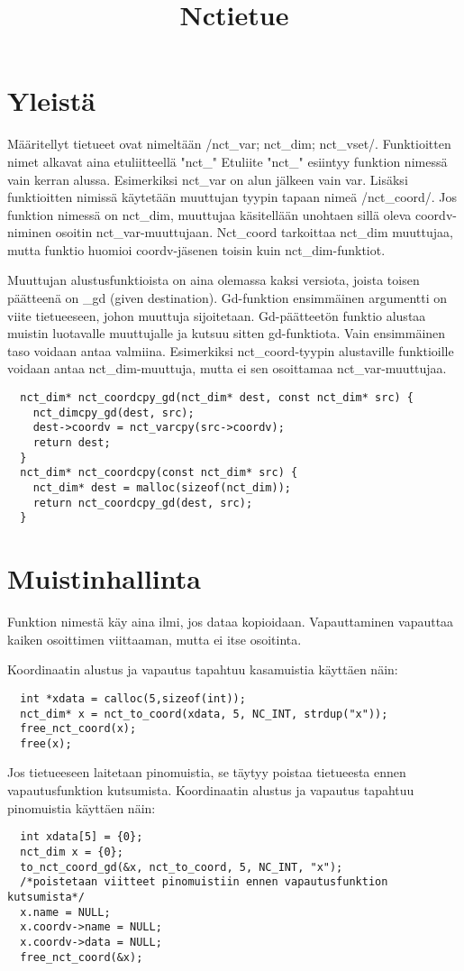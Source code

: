 \documentclass{scrartcl}
\title{Nctietue}
\begin{document}
\maketitle

\section{Yleistä}
Määritellyt tietueet ovat nimeltään \cinline/nct_var; nct_dim; nct_vset/.
Funktioitten nimet alkavat aina etuliitteellä "nct\_"
Etuliite "nct\_" esiintyy funktion nimessä vain kerran alussa.
Esimerkiksi nct\_var on alun jälkeen vain var.
Lisäksi funktioitten nimissä käytetään muuttujan tyypin tapaan nimeä \cinline/nct_coord/.
Jos funktion nimessä on nct\_dim, muuttujaa käsitellään unohtaen sillä oleva coordv-niminen osoitin nct\_var-muuttujaan.
Nct\_coord tarkoittaa nct\_dim muuttujaa, mutta funktio huomioi coordv-jäsenen toisin kuin nct\_dim-funktiot.

Muuttujan alustusfunktioista on aina olemassa kaksi versiota, joista toisen päätteenä on \_gd (given destination).
Gd-funktion ensimmäinen argumentti on viite tietueeseen, johon muuttuja sijoitetaan.
Gd-päätteetön funktio alustaa muistin luotavalle muuttujalle ja kutsuu sitten gd-funktiota.
Vain ensimmäinen taso voidaan antaa valmiina.
Esimerkiksi nct\_coord-tyypin alustaville funktioille voidaan antaa nct\_dim-muuttuja, mutta ei sen osoittamaa nct\_var-muuttujaa.
\begin{verbatim}
  nct_dim* nct_coordcpy_gd(nct_dim* dest, const nct_dim* src) {
    nct_dimcpy_gd(dest, src);
    dest->coordv = nct_varcpy(src->coordv);
    return dest;
  }
  nct_dim* nct_coordcpy(const nct_dim* src) {
    nct_dim* dest = malloc(sizeof(nct_dim));
    return nct_coordcpy_gd(dest, src);
  }
\end{verbatim}

\section{Muistinhallinta}
Funktion nimestä käy aina ilmi, jos dataa kopioidaan.
Vapauttaminen vapauttaa kaiken osoittimen viittaaman, mutta ei itse osoitinta.

Koordinaatin alustus ja vapautus tapahtuu kasamuistia käyttäen näin:
\begin{verbatim}
  int *xdata = calloc(5,sizeof(int));
  nct_dim* x = nct_to_coord(xdata, 5, NC_INT, strdup("x"));
  free_nct_coord(x);
  free(x);
\end{verbatim}
Jos tietueeseen laitetaan pinomuistia, se täytyy poistaa tietueesta ennen vapautusfunktion kutsumista.
Koordinaatin alustus ja vapautus tapahtuu pinomuistia käyttäen näin:
\begin{verbatim}
  int xdata[5] = {0};
  nct_dim x = {0};
  to_nct_coord_gd(&x, nct_to_coord, 5, NC_INT, "x");
  /*poistetaan viitteet pinomuistiin ennen vapautusfunktion kutsumista*/
  x.name = NULL;
  x.coordv->name = NULL;
  x.coordv->data = NULL;
  free_nct_coord(&x);
\end{verbatim}
\end{document}
